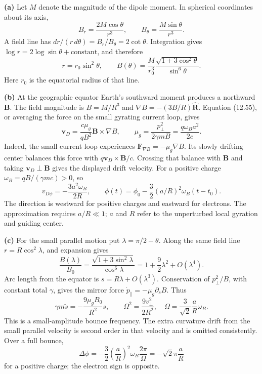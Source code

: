 \medskip\noindent\textbf{(a)} Let $M$ denote the magnitude of the dipole moment.  In spherical
coordinates about its axis,
\[
B_r=\frac{2M\cos\theta}{r^3},\qquad
B_\theta=\frac{M\sin\theta}{r^3}.
\]
A field line has $dr/(r\,d\theta)=B_r/B_\theta=2\cot\theta$.
Integration gives $\log r=2\log\sin\theta+\mathrm{constant}$,
and therefore
\[
\boxed{r=r_0\sin^2\theta,\qquad
 B(\theta)=\frac{M}{r_0^3}
 \frac{\sqrt{1+3\cos^2\theta}}{\sin^6\theta}.}
\]
Here $r_0$ is the equatorial radius of that line.

\medskip\noindent\textbf{(b)} At the geographic equator Earth's southward moment produces a
northward $\mathbf B$.  The field magnitude is $B=M/R^3$ and
$\nabla B=-(3B/R)\widehat{\mathbf R}$.
Equation (12.55), or averaging the force on the small gyrating
current loop, gives
\[
\mathbf v_D=\frac{c\mu_g}{qB^2}\mathbf B\times\nabla B,
\qquad
\mu_g=\frac{p_\perp^2}{2\gamma mB}
 =\frac{q\omega_Ba^2}{2c}.
\]
Indeed, the small current loop experiences
$\mathbf F_{\nabla B}=-\mu_g\nabla B$. Its slowly drifting center
balances this force with $q\mathbf v_D\times\mathbf B/c$.
Crossing that balance with $\mathbf B$ and taking
$\mathbf v_D\perp\mathbf B$ gives the displayed drift velocity.
For a positive charge $\omega_B=qB/(\gamma mc)>0$, so
\[
v_{D\phi}=-\frac{3a^2\omega_B}{2R},\qquad
\boxed{\phi(t)=\phi_0-\frac32(a/R)^2\omega_B(t-t_0).}
\]
The direction is westward for positive charges and eastward for
electrons.  The approximation requires $a/R\ll1$; $a$ and $R$
refer to the unperturbed local gyration and guiding center.

\medskip\noindent\textbf{(c)} For the small parallel motion put $\lambda=\pi/2-\theta$.
Along the same field line $r=R\cos^2\lambda$, and expansion gives
\[
\frac{B(\lambda)}{B_0}
=\frac{\sqrt{1+3\sin^2\lambda}}{\cos^6\lambda}
=1+\frac92\lambda^2+O(\lambda^4).
\]
Arc length from the equator is $s=R\lambda+O(\lambda^3)$.
Conservation of $p_\perp^2/B$, with constant total $\gamma$, gives
the mirror force $\dot p_\parallel=-\mu_g\partial_sB$.
Thus
\[
\gamma m\ddot s=-\frac{9\mu_gB_0}{R^2}s,
\qquad
\boxed{\Omega^2=\frac{9v_\perp^2}{2R^2},\quad
\Omega=\frac3{\sqrt2}\frac aR\omega_B.}
\]
This is a small-amplitude bounce frequency.  The extra curvature
drift from the small parallel velocity is second order in that
velocity and is omitted consistently.  Over a full bounce,
\[
\boxed{\Delta\phi=-\frac32\left(\frac aR\right)^2\omega_B
 \frac{2\pi}{\Omega}=-\sqrt2\pi\frac aR}
\]
for a positive charge; the electron sign is opposite.

